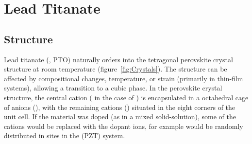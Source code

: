 \chapter{Lead Titanate}
\label{chap:Materials}
\thispagestyle{empty}



\section{Structure}
\label{sec:Materials-Struct}

Lead titanate (\PTO{}, PTO) naturally orders into the tetragonal perovskite crystal structure at room temperature (figure~\vref{fig:Crystals}). The structure can be affected by compositional changes, temperature, or strain (primarily in thin-film systems), allowing a transition to a cubic phase. In the perovskite crystal structure, the central cation (\TiIon{} in the case of \PTO{}) is encapsulated in a octahedral cage of anions (\OIon{}), with the remaining cations (\PbIon{}) situated in the eight corners of the unit cell.\cite{pan_abnormal_2001,harjuoja_2006,khan_deposition_2008,watanabe_growth_2007,kolpak_polarization_2007,chingprado_raman_1995,park_effect_2009,lee_effects_2009,lee_unusual_2010}
If the material was doped (as in a mixed solid-solution), some of the cations would be replaced with the dopant ions, for example \ZrIon{} would be randomly distributed in  \TiIon{} sites in the \PZT{} (PZT) system.
\cite{pan_abnormal_2001,harjuoja_2006,khan_deposition_2008,watanabe_growth_2007,kolpak_polarization_2007,chingprado_raman_1995,park_effect_2009,lee_effects_2009,lee_unusual_2010} 


